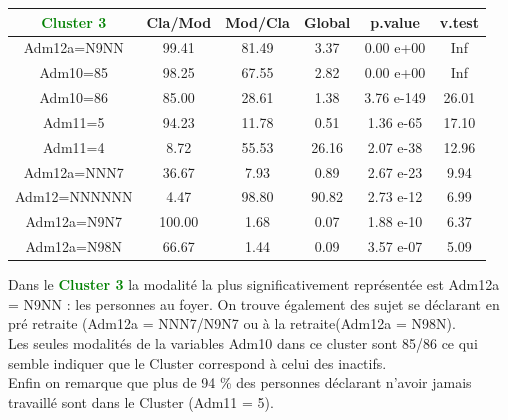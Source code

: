 \documentclass{book}
\begin{document}
\bigskip

\setlength\arrayrulewidth{2pt}
\begin{tabular}{|c||ccccc|}
\hline
 \textbf{\textcolor{green}{Cluster 3}}   &    Cla/Mod  &   Mod/Cla   &   Global   &    p.value  &   v.test  \\
 \hline
 \hline
 Adm12a=N9NN &  99.41& 81.49 & 3.37 & 0.00 e+00    &    Inf\\
Adm10=85     & 98.25 &67.55  &2.82 & 0.00 e+00   &     Inf\\
Adm10=86     & 85.00 &28.61  &1.38 &3.76 e-149  &26.01\\
Adm11=5      & 94.23 &11.78  &0.51  &1.36 e-65  &17.10\\
Adm11=4      &  8.72 &55.53& 26.16  &2.07 e-38  &12.96\\
Adm12a=NNN7  & 36.67 & 7.93 & 0.89  &2.67 e-23  & 9.94\\
Adm12=NNNNNN &  4.47 &98.80 &90.82  &2.73 e-12  & 6.99\\
Adm12a=N9N7  &100.00  &1.68 & 0.07  &1.88 e-10  & 6.37\\
Adm12a=N98N  & 66.67 & 1.44 & 0.09  &3.57 e-07  & 5.09\\
\hline
\end{tabular} 

\bigskip

\noindent
Dans le \textbf{\textcolor{green}{Cluster 3}} la modalité la plus significativement représentée est Adm12a = N9NN : les personnes au foyer. On trouve également des sujet se déclarant en pré retraite (Adm12a = NNN7/N9N7 ou à la retraite(Adm12a = N98N).\\
Les seules modalités de la variables Adm10 dans ce cluster sont 85/86 ce qui semble indiquer que le Cluster correspond à celui des inactifs.\\
Enfin on remarque que plus de 94 \% des personnes déclarant n'avoir jamais travaillé sont dans le Cluster (Adm11 = 5).\\
\end{document}
